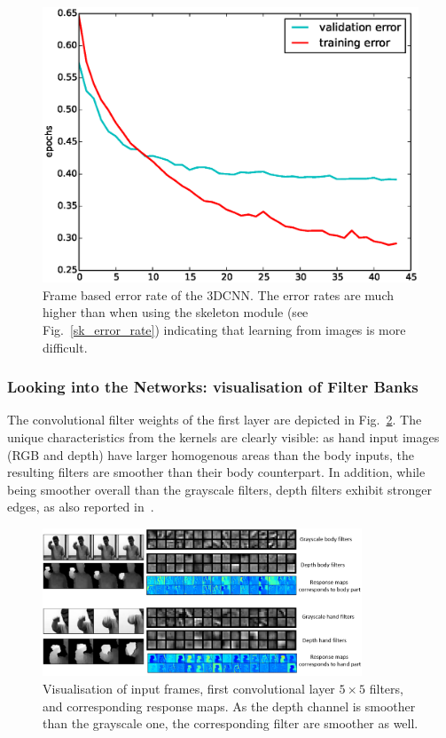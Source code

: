\begin{figure}[t]
  \centering
  \includegraphics[width=.4\textwidth]{images/3dcnn_filters/training_error}
  \caption{Frame based error rate of the 3DCNN. 
 The error rates are much higher than when using the skeleton module (see Fig.~\ref{sk_error_rate})
 indicating that  learning from images is more difficult. }
\label{fig:RGBErrorRate}
\end{figure}

\subsubsection{Looking into the Networks: visualisation of Filter Banks}

The convolutional filter weights of the first layer are depicted in Fig.~\ref{3dcnn_filters}. 
The unique characteristics from the kernels are clearly visible: as hand input images (RGB and depth) have larger homogenous areas than the body inputs, the resulting filters are smoother than their body counterpart.
In addition, while being smoother overall than the grayscale filters, depth filters exhibit stronger edges, 
 as also reported in~\cite{socher2012convolutional}.

\begin{figure}[t]
  \centering
  \includegraphics[width=0.85\textwidth]{images/CNN_filters}
  \caption{Visualisation of input frames, first convolutional layer $5\times5$ filters, and corresponding response maps.
As the depth channel is smoother than the grayscale one, the corresponding filter are smoother as well. 
}\label{3dcnn_filters}
\end{figure}


